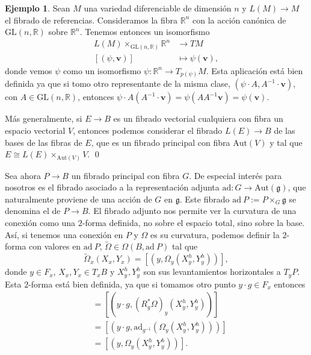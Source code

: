 \documentclass[12pt,a4paper]{article}
\theoremstyle{definition} \newtheorem{defn}[thm]{Definición}
\theoremstyle{definition} \newtheorem{ejemplo}[thm]{Ejemplo}
\theoremstyle{definition} \newtheorem{ejercicio}[thm]{Ejercicio}
\theoremstyle{remark} \newtheorem*{obs}{Observación}
\def\gg{\mathfrak{g}}
\def\ad{\mathrm{ad}}
\def\RR{\mathbb{R}}
\newcommand{\ve}[1]{\mathbf{#1}}
\let\emph\relax
\begin{document}
      \begin{ejemplo}
	Sean $M$ una variedad diferenciable de dimensión $n$ y $L(M)\rightarrow M$ el fibrado de referencias. Consideramos la fibra $\RR^n$ con la acción canónica de $\mathrm{GL}(n,\RR)$ sobre $\RR^n$. Tenemos entonces un isomorfismo
	\begin{align*}
	  L(M)\times_{\mathrm{GL}(n,\RR)} \RR^n&\longrightarrow TM\\ 
	   [(\psi, \ve{v})] &\longmapsto \psi(\ve{v}), 
	  \end{align*}
	  donde vemos $\psi$ como un isomorfismo $\psi:\RR^n \rightarrow T_{p(\psi)}M$. Esta aplicación está bien definida ya que si tomo otro representante de la misma clase, $(\psi \cdot A, A^{-1} \cdot \ve{v})$, con $A\in \mathrm{GL}(n,\RR)$, entonces $\psi\cdot A (A^{-1} \cdot \ve{v})= \psi(A A^{-1} \ve{v})=\psi(\ve{v})$. 

	  Más generalmente, si $E\rightarrow B$ es un fibrado vectorial cualquiera con fibra un espacio vectorial $V$, entonces podemos considerar el fibrado $L(E)\rightarrow B$ de las bases de las fibras de $E$, que es un fibrado principal con fibra $\mathrm{Aut}(V)$ y tal que $E\cong L(E)\times_{\mathrm{Aut}(V)} V$.
	  \qed
      \end{ejemplo}

      Sea ahora $P\rightarrow B$ un fibrado principal con fibra $G$. De especial interés para nosotros es el fibrado asociado a la representación adjunta $\ad:G\rightarrow \mathrm{Aut}(\gg)$, que naturalmente proviene de una acción de $G$ en $\gg$. Este fibrado $\ad\ P:=P\times_G \gg$ se denomina el \emph{fibrado adjunto} de $P\rightarrow B$. El fibrado adjunto nos permite ver la curvatura de una conexión como una $2$-forma definida, no sobre el espacio total, sino sobre la base. Así, si tenemos una conexión en $P$ y $\Omega$ es su curvatura, podemos definir la $2$-forma con valores en $\ad\ P$, $\tilde{\Omega}\in \Omega(B,\ad\ P)$ tal que
      \begin{equation*}
	\tilde{\Omega}_x(X_x,Y_x)=[(y,\Omega_y(X_y^h,Y_y^h))],
      \end{equation*}
      donde $y\in F_x$, $X_x,Y_x \in T_xB$ y $X_y^h,Y_y^h$ son sus levantamientos horizontales a $T_y P$. Esta $2$-forma está bien definida, ya que si tomamos otro punto $y\cdot g \in F_x$ entonces
      \begin{align*}
	[(y\cdot g,\Omega_{y\cdot g}(X^h_{y\cdot g},Y^h_{y\cdot g})]&=[(y\cdot g, (R^*_g\Omega)_y(X^h_y,Y^h_y))]\\ &=[(y\cdot g,\ad_{g^{-1}}(\Omega_y(X_y^h,Y_y^h)))]\\&=[(y,\Omega_y(X^h_y,Y^h_y))].
      \end{align*}
\end{document}
